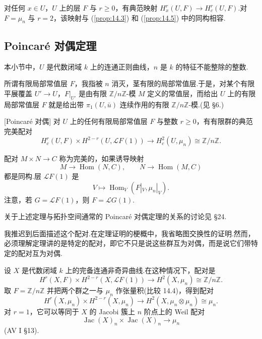 \begin{remark}\label{rem:14.6}
对任何 $x \in U$，$U$ 上的层 $F$ 与 $r \geq 0$，有典范映射 $H^{r}_{x}(U, F) \to H^{r}_{c}(U, F)$.对 $F = \mu_n$ 与 $r = 2$，该映射与 (\ref{prop:14.3}) 和 (\ref{prop:14.5}) 中的同构相容.
\end{remark}

\subsection*{Poincar\'e 对偶定理}

本小节中，$U$ 是代数闭域 $k$ 上的连通正则曲线，$n$ 是 $k$ 的特征不能整除的整数.

所谓有限局部常值层 $F$，我指被 $n$ 消灭，茎有限的局部常值层.于是，对某个有限平展覆盖 $U' \to U$，$F|_{U'}$ 是由有限 $\mathbb{Z}/n\mathbb{Z}$-模 $M$ 定义的常值层，而给出 $U$ 上的有限局部常值层 $F$ 就是给出带 $\pi_1(U, \bar{u})$ 连续作用的有限 $\mathbb{Z}/n\mathbb{Z}$-模.(见 \S 6.)

\begin{theorem}\label{thm:14.7}[Poincar\'e 对偶]
对 $U$ 上的任何有限局部常值层 $F$ 与整数 $r \geq 0$，有有限群的典范完美配对
\[
H^{r}_{c}(U, F) \times H^{2-r}(U, \mathcal{L}F(1)) \to H^{2}_{c}(U, \mu_n) \cong \mathbb{Z}/n\mathbb{Z}.
\]
\end{theorem}

配对 $M \times N \to C$ 称为完美的，如果诱导映射
\[
M \to \operatorname{Hom}(N, C), \qquad N \to \operatorname{Hom}(M, C)
\]
都是同构.层 $\mathcal{L}F(1)$ 是
\[
V \mapsto \operatorname{Hom}_{V}(F|_{V}, \mu_n|_{V}).
\]
注意，若 $G = \mathcal{L}F(1)$，则 $F = \mathcal{L}G(1)$.

关于上述定理与拓扑空间通常的 Poincar\'e 对偶定理的关系的讨论见 \S 24.

我推迟到后面描述这个配对.在定理证明的梗概中，我省略图交换性的证明.然而，必须理解定理讲的是特定的配对，即它不只是说这些群互为对偶，而是说它们带特定的配对互为对偶.

\begin{example}\label{ex:14.8}
设 $X$ 是代数闭域 $k$ 上的完备连通非奇异曲线.在这种情况下，配对是
\[
H^{r}(X, F) \times H^{2-r}(X, \mathcal{L}F(1)) \to H^{2}(X, \mu_n) \cong \mathbb{Z}/n\mathbb{Z}.
\]
取 $F = \mathbb{Z}/n\mathbb{Z}$ 并把两个群之一与 $\mu_n$ 作张量积(比较 14.4)，得到配对
\[
H^{r}(X, \mu_n) \times H^{2-r}(X, \mu_n) \to H^{2}(X, \mu_n \otimes \mu_n) \cong \mu_n.
\]
对 $r = 1$，它可以等同于 $X$ 的 Jacobi 簇上 $n$ 阶点上的 Weil 配对
\[
\operatorname{Jac}(X)_n \times \operatorname{Jac}(X)_n \to \mu_n
\]
(AV I \S 13).
\end{example}

